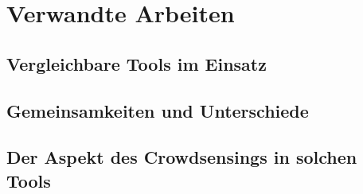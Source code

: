 \chapter{Verwandte Arbeiten} %


\section{Vergleichbare Tools im Einsatz}

\section{Gemeinsamkeiten und Unterschiede}

\section{Der Aspekt des Crowdsensings in solchen Tools}
